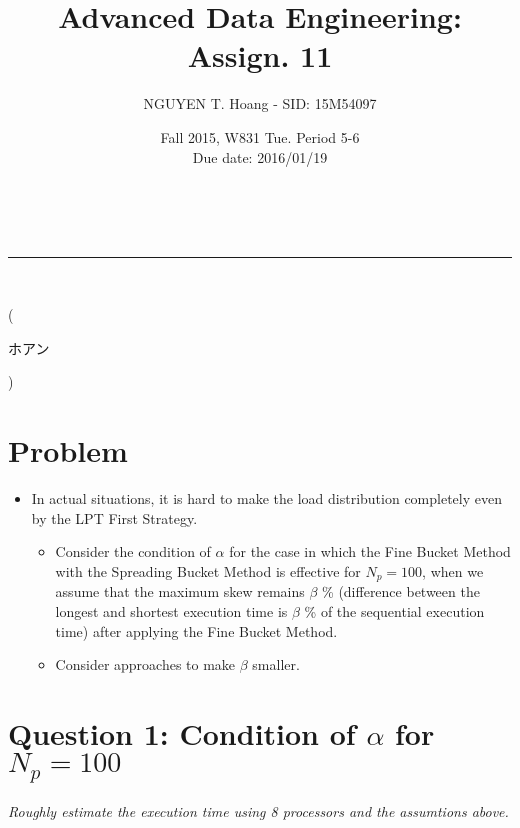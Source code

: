 \documentclass[a4paper,12pt]{article}
\makeatletter
\newcommand{\linia}{\rule{\linewidth}{0.5pt}}
\renewcommand{\maketitle} {
\begin{center}
\vspace{2ex}
{\LARGE \textsc{\@title}}
\vspace{1ex}
\\
\linia\\
\@author \hfill \@date
\vspace{4ex}
\end{center}
}
\makeatother
\begin{document}
\title{Advanced Data Engineering: Assign. 11}

\author{NGUYEN T. Hoang - SID: 15M54097}

\date{Fall 2015, W831 Tue. Period 5-6 \\ \hfill Due date: 2016/01/19}

\maketitle
\vspace{-4.5em}
\hspace{5.3em} (\begin{CJK}{UTF8}{min}ホアン\end{CJK})
\vspace{4em}
\section*{Problem}
\begin{itemize}
	\item In actual situations, it is hard to make the load distribution completely even by the LPT First Strategy.
\begin{itemize}
	\setlength{\parskip}{0cm}
	\setlength{\itemsep}{0cm}
	\item Consider the condition of $\alpha$ for the case in which the Fine Bucket Method with the Spreading Bucket Method is effective for $N_p = 100$, when we assume that the maximum skew remains $\beta$ \% (difference between the longest and shortest execution time is $\beta$ \% of the sequential execution time) after applying the Fine Bucket Method. 
	\item Consider approaches to make $\beta$ smaller.
\end{itemize}
\end{itemize}
\vspace{4em}
\section*{Question 1: Condition of $\alpha$ for $N_p = 100$}
\setcounter{section}{1}

\textit{Roughly estimate the execution time using 8 processors and the assumtions above.} 
\end{document}
